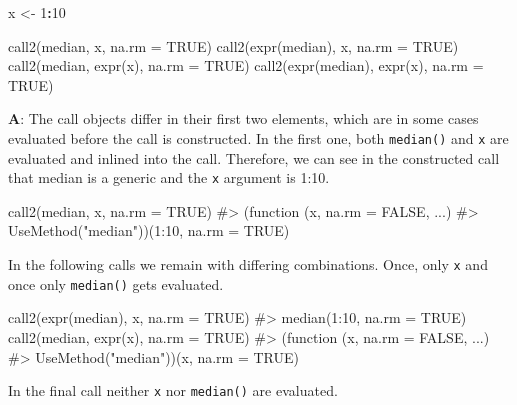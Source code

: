 \documentclass[
]{krantz}
\makeatletter
\newenvironment{Shaded}{\begin{snugshade}}{\end{snugshade}}
\newcommand{\CommentTok}[1]{\textcolor[rgb]{0.56,0.35,0.01}{\textit{#1}}}
\newcommand{\DataTypeTok}[1]{\textcolor[rgb]{0.13,0.29,0.53}{#1}}
\newcommand{\DecValTok}[1]{\textcolor[rgb]{0.00,0.00,0.81}{#1}}
\newcommand{\KeywordTok}[1]{\textcolor[rgb]{0.13,0.29,0.53}{\textbf{#1}}}
\newcommand{\NormalTok}[1]{#1}
\newcommand{\OperatorTok}[1]{\textcolor[rgb]{0.81,0.36,0.00}{\textbf{#1}}}
\newcommand{\OtherTok}[1]{\textcolor[rgb]{0.56,0.35,0.01}{#1}}
\newcommand{\StringTok}[1]{\textcolor[rgb]{0.31,0.60,0.02}{#1}}
\newenvironment{kframe}{%
\medskip{}
\setlength{\fboxsep}{.8em}
 \def\at@end@of@kframe{}%
 \ifinner\ifhmode%
  \def\at@end@of@kframe{\end{minipage}}%
  \begin{minipage}{\columnwidth}%
 \fi\fi%
 \def\FrameCommand##1{\hskip\@totalleftmargin \hskip-\fboxsep
 \colorbox{shadecolor}{##1}\hskip-\fboxsep
     \hskip-\linewidth \hskip-\@totalleftmargin \hskip\columnwidth}%
 \MakeFramed {\advance\hsize-\width
   \@totalleftmargin\z@ \linewidth\hsize
   \@setminipage}}%
 {\par\unskip\endMakeFramed%
 \at@end@of@kframe}
\renewenvironment{Shaded}{\begin{kframe}}{\end{kframe}}
\renewcommand{\KeywordTok} [1]{\textcolor[rgb]{0.00,0.44,0.13}{{#1}}}
\renewcommand{\DataTypeTok}[1]{\textcolor[rgb]{0.56,0.13,0.00}{{#1}}}
\renewcommand{\DecValTok}  [1]{\textcolor[rgb]{0.25,0.63,0.44}{{#1}}}
\renewcommand{\StringTok}  [1]{\textcolor[rgb]{0.25,0.44,0.63}{{#1}}}
\renewcommand{\CommentTok} [1]{\textcolor[rgb]{0.38,0.63,0.69}{{#1}}}
\renewcommand{\OtherTok}   [1]{\textcolor[rgb]{0.00,0.44,0.13}{{#1}}}
\renewcommand{\NormalTok}  [1]{{#1}}
\makeatother
\begin{document}
\begin{Shaded}
\begin{Highlighting}[]
\NormalTok{x <-}\StringTok{ }\DecValTok{1}\OperatorTok{:}\DecValTok{10}

\KeywordTok{call2}\NormalTok{(median, x, }\DataTypeTok{na.rm =} \OtherTok{TRUE}\NormalTok{)}
\KeywordTok{call2}\NormalTok{(}\KeywordTok{expr}\NormalTok{(median), x, }\DataTypeTok{na.rm =} \OtherTok{TRUE}\NormalTok{)}
\KeywordTok{call2}\NormalTok{(median, }\KeywordTok{expr}\NormalTok{(x), }\DataTypeTok{na.rm =} \OtherTok{TRUE}\NormalTok{)}
\KeywordTok{call2}\NormalTok{(}\KeywordTok{expr}\NormalTok{(median), }\KeywordTok{expr}\NormalTok{(x), }\DataTypeTok{na.rm =} \OtherTok{TRUE}\NormalTok{)}
\end{Highlighting}
\end{Shaded}

\textbf{{A}}: The call objects differ in their first two elements, which are in some cases evaluated before the call is constructed. In the first one, both \texttt{median()} and \texttt{x} are evaluated and inlined into the call. Therefore, we can see in the constructed call that median is a generic and the \texttt{x} argument is 1:10.

\begin{Shaded}
\begin{Highlighting}[]
\KeywordTok{call2}\NormalTok{(median, x, }\DataTypeTok{na.rm =} \OtherTok{TRUE}\NormalTok{)}
\CommentTok{#> (function (x, na.rm = FALSE, ...) }
\CommentTok{#> UseMethod("median"))(1:10, na.rm = TRUE)}
\end{Highlighting}
\end{Shaded}

In the following calls we remain with differing combinations. Once, only \texttt{x} and once only \texttt{median()} gets evaluated.

\begin{Shaded}
\begin{Highlighting}[]
\KeywordTok{call2}\NormalTok{(}\KeywordTok{expr}\NormalTok{(median), x, }\DataTypeTok{na.rm =} \OtherTok{TRUE}\NormalTok{)}
\CommentTok{#> median(1:10, na.rm = TRUE)}
\KeywordTok{call2}\NormalTok{(median, }\KeywordTok{expr}\NormalTok{(x), }\DataTypeTok{na.rm =} \OtherTok{TRUE}\NormalTok{)}
\CommentTok{#> (function (x, na.rm = FALSE, ...) }
\CommentTok{#> UseMethod("median"))(x, na.rm = TRUE)}
\end{Highlighting}
\end{Shaded}

In the final call neither \texttt{x} nor \texttt{median()} are evaluated.
\end{document}
